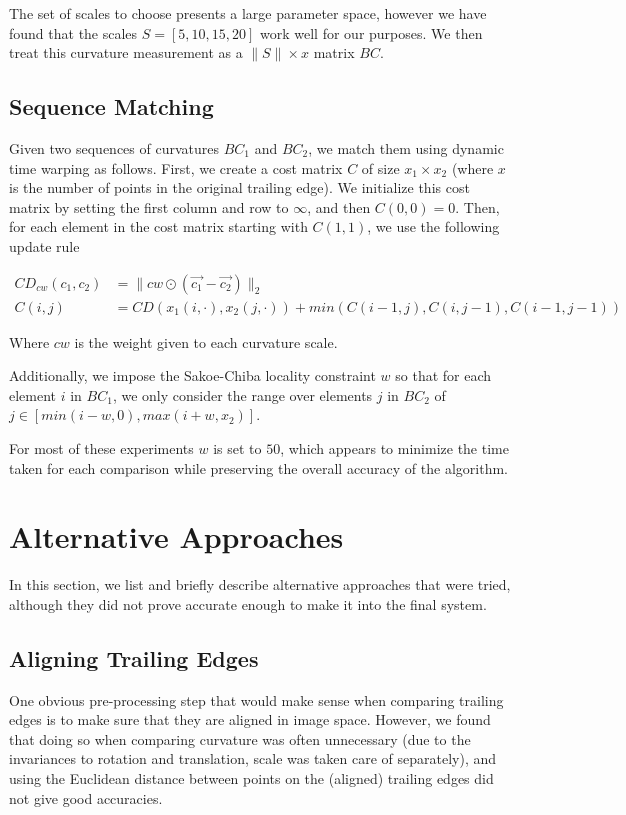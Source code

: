 The set of scales to choose presents a large parameter space, however we have found that the scales $S = [5, 10, 15, 20]$ work well for our purposes.
We then treat this curvature measurement as a $\|S\| \times x$ matrix $BC$.

\subsection{Sequence Matching}

Given two sequences of curvatures $BC_1$ and $BC_2$, we match them using dynamic time warping as follows.
First, we create a cost matrix $C$ of size $x_1 \times x_2$ (where $x$ is the number of points in the original trailing edge).
We initialize this cost matrix by setting the first column and row to $\infty$, and then $C(0,0) = 0$.
Then, for each element in the cost matrix starting with $C(1,1)$, we use the following update rule

\begin{align}
CD_{cw}(c_1, c_2) &= \lVert cw \odot (\vec{c_1} - \vec{c_2}) \rVert_2\\
C(i,j) &= CD(x_1(i,\cdot),x_2(j,\cdot)) + min(C(i-1,j), C(i,j-1), C(i-1, j-1))
\end{align}

Where $cw$ is the weight given to each curvature scale.

Additionally, we impose the Sakoe-Chiba \cite{sakoe1978dynamic} locality constraint $w$ so that for each element $i$ in $BC_1$, we only consider the range over elements $j$ in $BC_2$ of $j \in [min(i - w, 0), max(i + w, x_2)]$.

For most of these experiments $w$ is set to $50$, which appears to minimize the time taken for each comparison while preserving the overall accuracy of the algorithm.

\section{Alternative Approaches}

In this section, we list and briefly describe alternative approaches that were tried, although they did not prove accurate enough to make it into the final system.

\subsection{Aligning Trailing Edges}

One obvious pre-processing step that would make sense when comparing trailing edges is to make sure that they are aligned in image space.
However, we found that doing so when comparing curvature was often unnecessary (due to the invariances to rotation and translation, scale was taken care of separately), and using the Euclidean distance between points on the (aligned) trailing edges did not give good accuracies.

